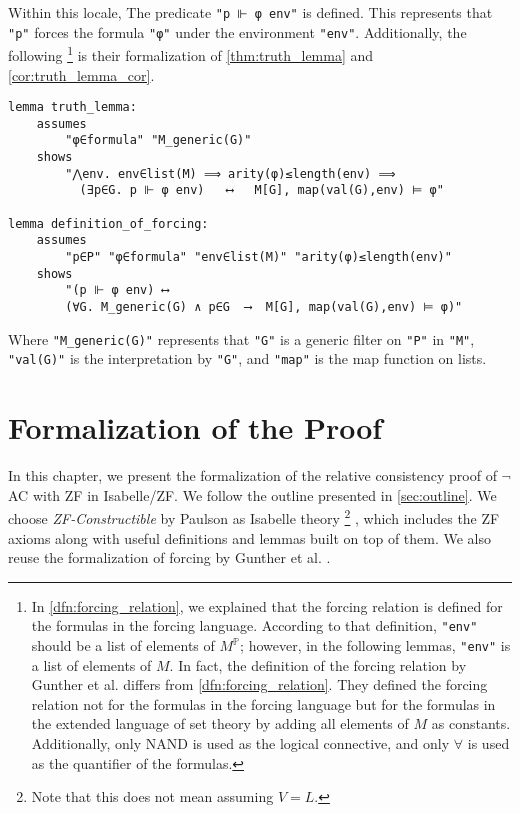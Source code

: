 \documentclass{report}
\newenvironment{isaframe}{\begin{mdframed}[topline=false, rightline=false, bottomline=false]}{\end{mdframed}}
\begin{document}
Within this locale, The predicate \texttt{"p ⊩ φ env"} is defined.
This represents that \texttt{"p"} forces the formula \texttt{"φ"} under the environment \texttt{"env"}.
Additionally, the following
\footnote{
In \cref{dfn:forcing_relation},
we explained that the forcing relation is defined for the formulas in the forcing language.
According to that definition, \texttt{"env"} should be a list of elements of $M^{\mathbb{P}}$;
however, in the following lemmas, \texttt{"env"} is a list of elements of $M$.
In fact, the definition of the forcing relation by Gunther et al. differs from \cref{dfn:forcing_relation}.
They defined the forcing relation not for the formulas in the forcing language 
but for the formulas in the extended language of set theory by adding all elements of $M$ as constants.
Additionally, only NAND is used as the logical connective, and only $\forall$ is used as the quantifier of the formulas.
} is their formalization of \cref{thm:truth_lemma} and \cref{cor:truth_lemma_cor}.
\begin{isaframe}
\begin{verbatim}
lemma truth_lemma:
    assumes 
        "φ∈formula" "M_generic(G)"
    shows 
        "⋀env. env∈list(M) ⟹ arity(φ)≤length(env) ⟹ 
          (∃p∈G. p ⊩ φ env)   ⟷   M[G], map(val(G),env) ⊨ φ"

lemma definition_of_forcing:
    assumes
        "p∈P" "φ∈formula" "env∈list(M)" "arity(φ)≤length(env)"
    shows
        "(p ⊩ φ env) ⟷
        (∀G. M_generic(G) ∧ p∈G  ⟶  M[G], map(val(G),env) ⊨ φ)"
\end{verbatim}
\end{isaframe}
Where \texttt{"M\_generic(G)"} represents that \texttt{"G"} is a generic filter on \texttt{"P"} in \texttt{"M"},
\texttt{"val(G)"} is the interpretation by \texttt{"G"},
and \texttt{"map"} is the map function on lists.




\chapter{Formalization of the Proof} 
In this chapter, we present the formalization of the relative consistency proof of $\neg$AC with ZF in Isabelle/ZF.
We follow the outline presented in \cref{sec:outline}.
We choose \emph{ZF-Constructible} by Paulson \cite{paulson_AC_consistency} as Isabelle theory 
\footnote{Note that this does not mean assuming $V=L$.}
, which includes the ZF axioms along with useful definitions and lemmas built on top of them.
We also reuse the formalization of forcing by Gunther et al. \cite{gunther_forcing}.
\end{document}
